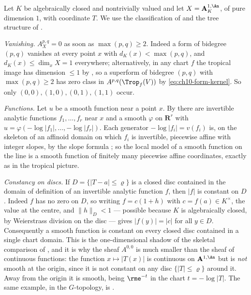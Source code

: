 \begin{example}
\label{ex:ch13-affine-line}
Let $K$ be algebraically closed and nontrivially valued and let
$X=\mathbf A^{1,\An}_K$, of pure dimension $1$, with coordinate $T$.  We use
the classification of  and the tree
structure of .

\emph{Vanishing.} $A^{p,q}_X=0$ as soon as $\max(p,q)\ge2$.  Indeed a form
of bidegree $(p,q)$ vanishes at every point $x$ with $d_K(x)<\max(p,q)$, and
$d_K(x)\le\dim_xX=1$ everywhere; alternatively, in any chart $f$ the tropical
image has dimension $\le1$ by , so a
superform of bidegree $(p,q)$ with $\max(p,q)\ge2$ has zero class in
$A^{p,q}(\Trop_f(V))$ by \eqref{eq:ch10-form-kernel}.  So only
$(0,0),(1,0),(0,1),(1,1)$ occur.

\emph{Functions.} Let $u$ be a smooth function near a point $x$.  By
 there are invertible analytic functions
$f_1,\ldots,f_r$ near $x$ and a smooth $\varphi$ on $\mathbf R^r$ with
$u=\varphi(-\log|f_1|,\ldots,-\log|f_r|)$.  Each generator
$-\log|f_i|=v(f_i)$ is, on the skeleton of an affinoid domain on which $f_i$
is invertible, piecewise affine with integer slopes, by the slope formula
; so the local model of a smooth function on the
line is a smooth function of finitely many piecewise affine coordinates,
exactly as in the tropical picture.

\emph{Constancy on discs.} If $D=\{|T-a|\le\varrho\}$ is a closed disc
contained in the domain of definition of an invertible analytic function $f$,
then $|f|$ is constant on $D$.  Indeed $f$ has no zero on $D$, so writing
$f=c(1+h)$ with $c=f(a)\in K^\times$, the value at the centre, and
$\|h\|_D<1$ --- possible because
$K$ is algebraically closed, by Weierstrass division on the disc --- gives
$|f(y)|=|c|$ for all $y\in D$.  Consequently a smooth function is constant on
every closed disc contained in a single chart domain.  This is the
one-dimensional shadow of the skeletal comparison of
, and it is why the sheaf $A^{0,0}$ is much smaller
than the sheaf of continuous functions: the function $x\mapsto|T(x)|$ is
continuous on $\mathbf A^{1,\An}$ but is \emph{not} smooth at the origin,
since it is not constant on any disc $\{|T|\le\varrho\}$ around it.  Away
from the origin it is smooth, being $\rme^{-t}$ in the chart $t=-\log|T|$.
The same example, in the $G$-topology, is
\cite[\S3.4.8]{CLD25}.


\end{example}
